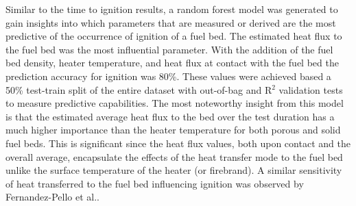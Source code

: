     Similar to the time to ignition results, a random forest model was generated to gain insights into which parameters that are measured or derived are the most predictive of the occurrence of ignition of a fuel bed. The estimated heat flux to the fuel bed was the most influential parameter.  With the addition of the fuel bed density, heater temperature, and heat flux at contact with the fuel bed the prediction accuracy for ignition was 80\%.  These values were achieved based a 50\% test-train split of the entire dataset with out-of-bag and R$^{2}$ validation tests to measure predictive capabilities. The most noteworthy insight from this model is that the estimated average heat flux to the bed over the test duration has a much higher importance than the heater temperature for both porous and solid fuel beds. This is significant since the heat flux values, both upon contact and the overall average, encapsulate the effects of the heat transfer mode to the fuel bed unlike the surface temperature of the heater (or firebrand). A similar sensitivity of heat transferred to the fuel bed influencing ignition was observed by Fernandez-Pello et al.\cite{Fernandez-Pello2015}.
    
